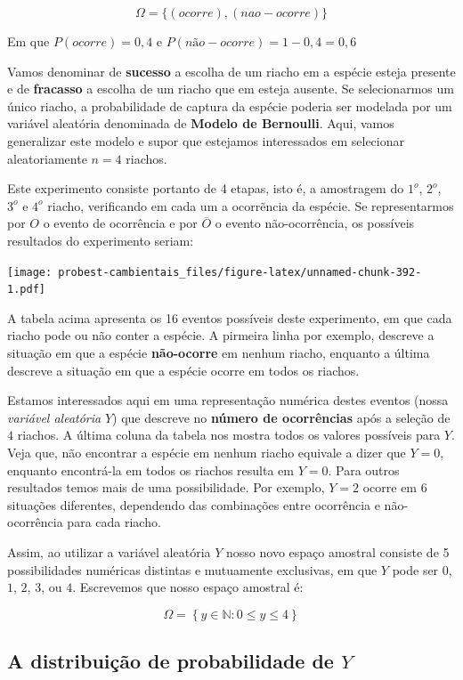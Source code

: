 \documentclass[
]{book}
\begin{document}
\[\Omega = \{(ocorre), (nao-ocorre)\}\]

Em que \(P(ocorre) = 0,4\) e \(P(não-ocorre) = 1-0,4 = 0,6\)

Vamos denominar de \textbf{sucesso} a escolha de um riacho em a espécie esteja presente e de \textbf{fracasso} a escolha de um riacho que em esteja ausente. Se selecionarmos um único riacho, a probabilidade de captura da espécie poderia ser modelada por um variável aleatória denominada de \textbf{Modelo de Bernoulli}. Aqui, vamos generalizar este modelo e supor que estejamos interessados em selecionar aleatoriamente \(n = 4\) riachos.

Este experimento consiste portanto de 4 etapas, isto é, a amostragem do \(1^o\), \(2^o\), \(3^o\) e \(4^o\) riacho, verificando em cada um a ocorrẽncia da espécie. Se representarmos por \(O\) o evento de ocorrência e por \(\overline{O}\) o evento não-ocorrência, os possíveis resultados do experimento seriam:

\texttt{[image: probest-cambientais\_files/figure-latex/unnamed-chunk-392-1.pdf]}

A tabela acima apresenta os 16 eventos possíveis deste experimento, em que cada riacho pode ou não conter a espécie. A pirmeira linha por exemplo, descreve a situação em que a espécie \textbf{não-ocorre} em nenhum riacho, enquanto a última descreve a situação em que a espécie ocorre em todos os riachos.

Estamos interessados aqui em uma representação numérica destes eventos (nossa \emph{variável aleatória} \(Y\)) que descreve no \textbf{número de ocorrências} após a seleção de \(4\) riachos. A última coluna da tabela nos mostra todos os valores possíveis para \(Y\). Veja que, não encontrar a espécie em nenhum riacho equivale a dizer que \(Y = 0\), enquanto encontrá-la em todos os riachos resulta em \(Y = 0\). Para outros resultados temos mais de uma possibilidade. Por exemplo, \(Y = 2\) ocorre em 6 situações diferentes, dependendo das combinações entre ocorrência e não-ocorrência para cada riacho.

Assim, ao utilizar a variável aleatória \(Y\) nosso novo espaço amostral consiste de 5 possibilidades numéricas distintas e mutuamente exclusivas, em que \(Y\) pode ser \(0\), \(1\), \(2\), \(3\), ou \(4\). Escrevemos que nosso espaço amostral é:

\[\Omega = \left\{ y \in \mathbb{N}: 0 \le y \le 4 \right\}\]

\hypertarget{a-distribuiuxe7uxe3o-de-probabilidade-de-y}{%
\subsection*{\texorpdfstring{A distribuição de probabilidade de \(Y\)}{A distribuição de probabilidade de Y}}\label{a-distribuiuxe7uxe3o-de-probabilidade-de-y}}
\end{document}
